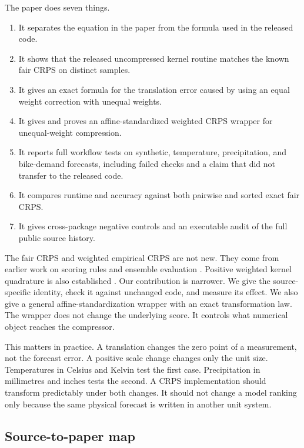 \documentclass[11pt]{article}
\begin{document}
The paper does seven things.
\begin{enumerate}
\item It separates the equation in the paper from the formula used in the released code.
\item It shows that the released uncompressed kernel routine matches the known fair CRPS on distinct samples.
\item It gives an exact formula for the translation error caused by using an equal weight correction with unequal weights.
\item It gives and proves an affine-standardized weighted CRPS wrapper for unequal-weight compression.
\item It reports full workflow tests on synthetic, temperature, precipitation, and bike-demand forecasts, including failed checks and a claim that did not transfer to the released code.
\item It compares runtime and accuracy against both pairwise and sorted exact fair CRPS.
\item It gives cross-package negative controls and an executable audit of the full public source history.
\end{enumerate}

The fair CRPS and weighted empirical CRPS are not new. They come from earlier work on scoring rules and ensemble evaluation \cite{matheson,gneiting,ferro,zamo,bouallegue,kelen}. Positive weighted kernel quadrature is also established \cite{hayakawa}. Our contribution is narrower. We give the source-specific identity, check it against unchanged code, and measure its effect. We also give a general affine-standardization wrapper with an exact transformation law. The wrapper does not change the underlying score. It controls what numerical object reaches the compressor.

This matters in practice. A translation changes the zero point of a measurement, not the forecast error. A positive scale change changes only the unit size. Temperatures in Celsius and Kelvin test the first case. Precipitation in millimetres and inches tests the second. A CRPS implementation should transform predictably under both changes. It should not change a model ranking only because the same physical forecast is written in another unit system.

\subsection*{Source-to-paper map}
\end{document}
